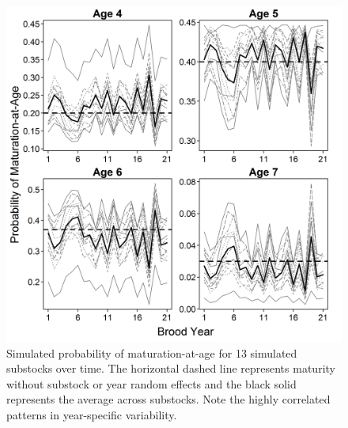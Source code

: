 \documentclass[12pt,]{book}
\theoremstyle{definition}
\theoremstyle{definition}
\theoremstyle{definition}
\theoremstyle{remark}
\begin{document}
\begin{figure}
  \centering
  \includegraphics{img/Ch4/maturity-sim-fig.jpg}
  \caption{Simulated probability of maturation-at-age for 13 simulated substocks over time. The horizontal dashed line represents maturity without substock or year random effects and the black solid represents the average across substocks. Note the highly correlated patterns in year-specific variability.}
  \label{fig:maturity-sim-fig}
\end{figure}

\singlespacing


\end{document}
